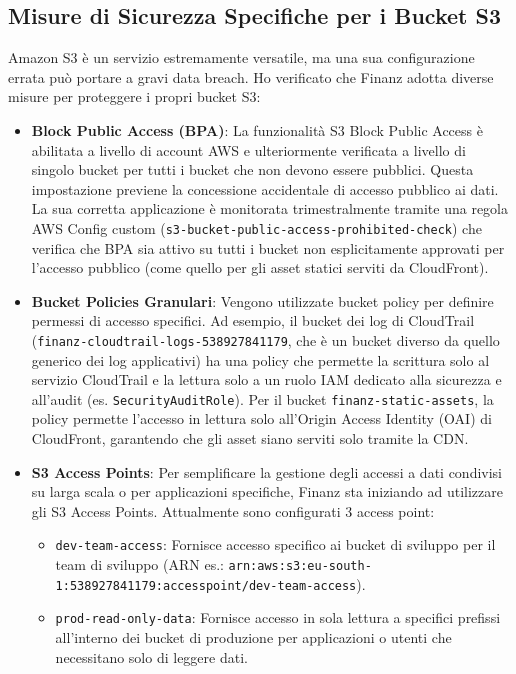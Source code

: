\subsection{Misure di Sicurezza Specifiche per i Bucket S3}
\label{subsec:s3-security_cap2}
Amazon S3 è un servizio estremamente versatile, ma una sua configurazione errata può portare a gravi data breach. Ho verificato che Finanz adotta diverse misure per proteggere i propri bucket S3:
\begin{itemize}
    \item \textbf{Block Public Access (BPA)}: La funzionalità S3 Block Public Access è abilitata a livello di account AWS e ulteriormente verificata a livello di singolo bucket per tutti i bucket che non devono essere pubblici. Questa impostazione previene la concessione accidentale di accesso pubblico ai dati. La sua corretta applicazione è monitorata trimestralmente tramite una regola AWS Config custom (\texttt{s3-bucket-public-access-prohibited-check}) che verifica che BPA sia attivo su tutti i bucket non esplicitamente approvati per l'accesso pubblico (come quello per gli asset statici serviti da CloudFront).
    \item \textbf{Bucket Policies Granulari}: Vengono utilizzate bucket policy per definire permessi di accesso specifici. Ad esempio, il bucket dei log di CloudTrail (\texttt{finanz-cloudtrail-logs-538927841179}, che è un bucket diverso da quello generico dei log applicativi) ha una policy che permette la scrittura solo al servizio CloudTrail e la lettura solo a un ruolo IAM dedicato alla sicurezza e all'audit (es. \texttt{SecurityAuditRole}). Per il bucket \texttt{finanz-static-assets}, la policy permette l'accesso in lettura solo all'Origin Access Identity (OAI) di CloudFront, garantendo che gli asset siano serviti solo tramite la CDN.
    \item \textbf{S3 Access Points}: Per semplificare la gestione degli accessi a dati condivisi su larga scala o per applicazioni specifiche, Finanz sta iniziando ad utilizzare gli S3 Access Points. Attualmente sono configurati 3 access point:
        \begin{itemize}
            \item \texttt{dev-team-access}: Fornisce accesso specifico ai bucket di sviluppo per il team di sviluppo (ARN es.: \texttt{arn:aws:s3:eu-south-1:538927841179:accesspoint/dev-team-access}).
            \item \texttt{prod-read-only-data}: Fornisce accesso in sola lettura a specifici prefissi all'interno dei bucket di produzione per applicazioni o utenti che necessitano solo di leggere dati.

\end{itemize}
\end{itemize}
